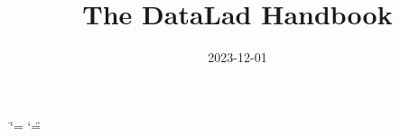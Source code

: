 \documentclass[letterpaper,10pt,english,twoside]{sphinxmanual}
\title{The DataLad Handbook}
\date{2023-12-01}
\author{}
\begin{document}
\ifdefined\shorthandoff
  \ifnum\catcode`\=\string=\active\shorthandoff{=}\fi
  \ifnum\catcode`\"=\active{}\fi
\fi

\pagestyle{empty}
\newcommand{\withauthors}{\mbox{Laura Waite}, \mbox{Kyle Meyer}, \mbox{Marisa Heckner}, \mbox{Benjamin Poldrack}, \mbox{Yaroslav Halchenko}, \mbox{Chris Markiewicz}, \mbox{Pattarawat Chormai}, \mbox{Lisa N. Mochalski}, \mbox{Lisa Wiersch}, \mbox{Jean-Baptiste Poline}, \mbox{Nevena Kraljevic}, \mbox{Alex Waite}, \mbox{Lya K. Paas}, \mbox{Niels Reuter}, \mbox{Peter Vavra}, \mbox{Tobias Kadelka}, \mbox{Peer Herholz}, \mbox{Alexandre Hutton}, \mbox{Sarah Oliveira}, \mbox{Dorian Pustina}, \mbox{Hamzah Hamid Baagil}, \mbox{Tristan Glatard}, \mbox{Giulia Ippoliti}, \mbox{Christian Mönch}, \mbox{Togaru Surya Teja}, \mbox{Dorien Huijser}, \mbox{Ariel Rokem}, \mbox{Remi Gau}, \mbox{Judith Bomba}, \mbox{Konrad Hinsen}, \mbox{Wu Jianxiao}, \mbox{Małgorzata Wierzba}, \mbox{Stefan Appelhoff}, \mbox{Michael Joseph}, \mbox{Tamara Cook}, \mbox{Stephan Heunis}, \mbox{Joerg Stadler}, \mbox{Sin Kim}, \mbox{Oscar Esteban}, \mbox{Michał Szczepanik}, \mbox{Eduard Ort}, \mbox{Myrskyta}, \mbox{Thomas Guiot}, \mbox{Julius Breuer}, \mbox{Ikko Ashimine}, \mbox{Arshitha Basavaraj}, \mbox{Anthony J Veltri}, \mbox{Isil Bilgin}, \mbox{Julian Kosciessa}, \mbox{Isaac To}, \mbox{Austin Macdonald}, \mbox{Christopher S. Hall}, \mbox{John C. Ford}, \mbox{Julien Colomb}, \mbox{Danny Garside}}

\pagestyle{plain}
\sphinxtableofcontents
\pagestyle{normal}
\label{\detokenize{book_main::doc}}


\mainmatter

 \fancyhead[LE]{\small\thepage}
 \fancyhead[RO]{\small\thepage}
 \fancyhead[RE]{\small\nouppercase{\leftmark}}
 \fancyhead[LO]{\small\nouppercase{\rightmark}}
 \fancyfoot{}
 \fancyfoot[LE]{}
 \renewcommand*{\footrule}{}%

\sphinxstepscope
\end{document}
